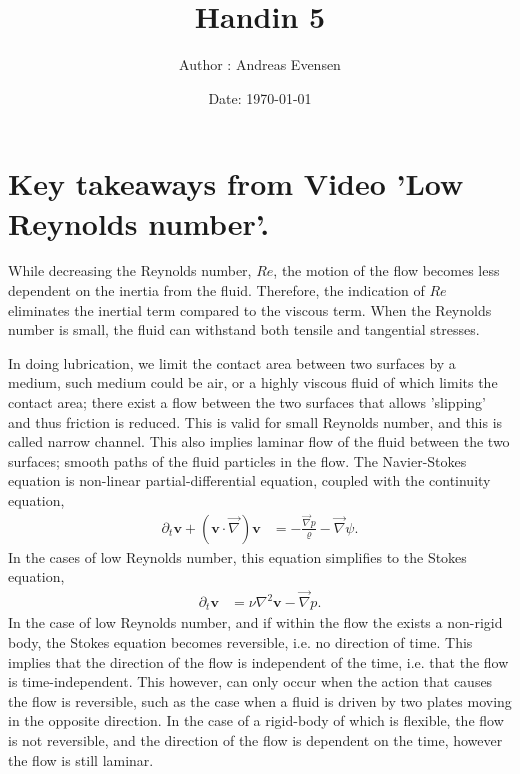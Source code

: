 \documentclass{article}
\title{Handin 5}
\author{Author : Andreas Evensen}
\date{Date: \today}
\newcommand{\laplace}{\nabla^2}
\begin{document}
\maketitle

\section*{Key takeaways from Video 'Low Reynolds number'.}
While decreasing the Reynolds number, $Re$, the motion of the flow becomes less dependent on the inertia from the fluid.
Therefore, the indication of $Re$ eliminates the inertial term compared to the viscous term. When the Reynolds number is small, the fluid can withstand both tensile and tangential stresses.

\vspace{0.7cm}\noindent
In doing lubrication, we limit the contact area between two surfaces by a medium, such medium could be air, or a highly viscous fluid of which limits the contact area;
there exist a flow between the two surfaces that allows 'slipping' and thus friction is reduced. This is valid for small Reynolds number, and this is called narrow channel. 
This also implies laminar flow of the fluid between the two surfaces; smooth paths of the fluid particles in the flow.
The Navier-Stokes equation is non-linear partial-differential equation, coupled with the continuity equation,
\begin{align}
    \partial_t\mathbf{v} + \left(\mathbf{v}\cdot\vec{\nabla}\right)\mathbf{v} &= - \frac{\vec{\nabla}p }{\varrho} - \vec{\nabla}\psi.\label{eq: Navier-Stokes}
\end{align}In the cases of low Reynolds number, this equation simplifies to the Stokes equation,
\begin{align}
    \partial_t\mathbf{v} &= \nu\laplace\mathbf{v} - \vec{\nabla}p.\label{eq: Stokes}
\end{align}
In the case of low Reynolds number, and if within the flow the exists a non-rigid body, the Stokes equation becomes reversible, i.e. no direction of time.
This implies that the direction of the flow is independent of the time, i.e. that the flow is time-independent.
This however, can only occur when the action that causes the flow is reversible, such as the case when a fluid is driven by two plates moving in the opposite direction. 
In the case of a rigid-body of which is flexible, the flow is not reversible, and the direction of the flow is dependent on the time, however the flow is still laminar.
\end{document}
